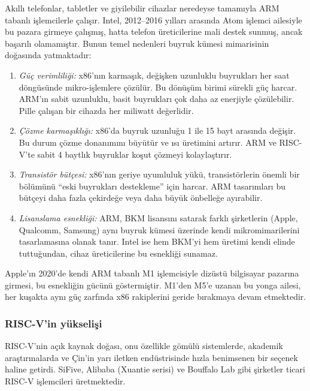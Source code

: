 \begin{bilginot}
Akıllı telefonlar, tabletler ve giyilebilir cihazlar neredeyse tamamıyla ARM tabanlı işlemcilerle çalışır. Intel, 2012--2016 yılları arasında Atom işlemci ailesiyle bu pazara girmeye çalışmış, hatta telefon üreticilerine mali destek sunmuş, ancak başarılı olamamıştır. Bunun temel nedenleri buyruk kümesi mimarisinin doğasında yatmaktadır:

\begin{enumerate}[nosep]
\item \emph{Güç verimliliği:} x86'nın karmaşık, değişken uzunluklu buyrukları her saat döngüsünde mikro-işlemlere çözülür. Bu dönüşüm birimi sürekli güç harcar. ARM'ın sabit uzunluklu, basit buyrukları çok daha az enerjiyle çözülebilir. Pille çalışan bir cihazda her miliwatt değerlidir.
\item \emph{Çözme karmaşıklığı:} x86'da buyruk uzunluğu 1 ile 15 bayt arasında değişir. Bu durum çözme donanımını büyütür ve ısı üretimini artırır. ARM ve RISC-V'te sabit 4 baytlık buyruklar koşut çözmeyi kolaylaştırır.
\item \emph{Transistör bütçesi:} x86'nın geriye uyumluluk yükü, transistörlerin önemli bir bölümünü ``eski buyrukları destekleme'' için harcar. ARM tasarımları bu bütçeyi daha fazla çekirdeğe veya daha büyük önbelleğe ayırabilir.
\item \emph{Lisanslama esnekliği:} ARM, BKM lisansını satarak farklı şirketlerin (Apple, Qualcomm, Samsung) aynı buyruk kümesi üzerinde kendi mikromimarilerini tasarlamasına olanak tanır. Intel ise hem BKM'yi hem üretimi kendi elinde tuttuğundan, cihaz üreticilerine bu esnekliği sunamaz.
\end{enumerate}

Apple'ın 2020'de kendi ARM tabanlı M1 işlemcisiyle dizüstü bilgisayar pazarına girmesi, bu esnekliğin gücünü göstermiştir. M1'den M5'e uzanan bu yonga ailesi, her kuşakta aynı güç zarfında x86 rakiplerini geride bırakmaya devam etmektedir.
\end{bilginot}

\subsubsection*{RISC-V'in yükselişi}
RISC-V'nin açık kaynak doğası, onu özellikle gömülü sistemlerde, akademik araştırmalarda ve Çin'in yarı iletken endüstrisinde hızla benimsenen bir seçenek haline getirdi. SiFive, Alibaba (Xuantie serisi) ve Bouffalo Lab gibi şirketler ticari RISC-V işlemcileri üretmektedir.

